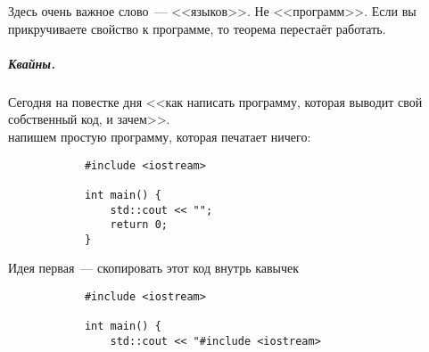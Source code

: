 \documentclass{article}
\begin{document}
    \begin{remark}
        Здесь очень важное слово~--- <<языков>>. Не <<программ>>. Если вы прикручиваете свойство к программе, то теорема перестаёт работать.
    \end{remark}
    \subparagraph{Квайны.}
    \begin{remark}
        Сегодня на повестке дня <<как написать программу, которая выводит свой собственный код, и зачем>>.\\
        напишем простую программу, которая печатает ничего:
        \begin{verbatim}
            #include <iostream>
            
            int main() {
                std::cout << "";
                return 0;
            }
        \end{verbatim}
        Идея первая~--- скопировать этот код внутрь кавычек
        \begin{verbatim}
            #include <iostream>
            
            int main() {
                std::cout << "#include <iostream>
                

\end{verbatim}
\end{remark}
\end{document}

